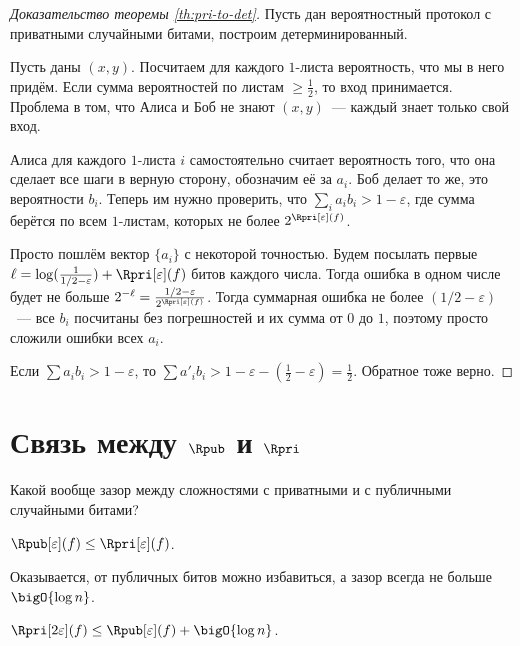 \begin{proof}[Доказательство теоремы \ref{th:pri-to-det}]
    Пусть дан вероятностный протокол с приватными случайными битами, построим детерминированный.

    Пусть даны $(x, y)$. Посчитаем для каждого $1$-листа вероятность, что мы в него придём. Если сумма
    вероятностей по листам $\ge \frac{1}{2}$, то вход принимается. Проблема в том, что Алиса и Боб не
    знают $(x, y)$~--- каждый знает только свой вход.

    Алиса для каждого $1$-листа $i$ самостоятельно считает вероятность того, что она сделает все шаги в
    верную сторону, обозначим её за $a_i$. Боб делает то же, это вероятности $b_i$. Теперь им нужно
    проверить, что $\sum\limits_i a_ib_i > 1 - \varepsilon$, где сумма берётся по всем $1$-листам,
    которых не более $2^{\Rpri[\varepsilon](f)}$.

    Просто пошлём вектор $\{a_i\}$ с некоторой точностью. Будем посылать первые $\ell = \log(\frac{1}{1/2
        - \varepsilon}) + \Rpri[\varepsilon](f)$ битов каждого числа. Тогда ошибка в одном числе будет не
    больше $2^{-\ell} = \frac{1/2 - \varepsilon}{2^{\Rpri[\varepsilon](f)}}$. Тогда суммарная ошибка не
    более $(1 / 2 - \varepsilon)$~--- все $b_i$ посчитаны без погрешностей и их сумма от $0$ до $1$,
    поэтому просто сложили ошибки всех $a_i$.

    Если $\sum a_ib_i >  1 - \varepsilon$, то $\sum a'_ib_i >  1 - \varepsilon - (\frac{1}{2} -
    \varepsilon) = \frac{1}{2}$. Обратное тоже верно.
\end{proof}

\section{Связь между \texorpdfstring{$\Rpub$}{R[pub]} и \texorpdfstring{$\Rpri$}{R[pr]}}
Какой вообще зазор между сложностями с приватными и с публичными случайными битами?
\begin{proposition}
    $\Rpub[\varepsilon](f) \le \Rpri[\varepsilon](f)$.
\end{proposition}

Оказывается, от публичных битов можно избавиться, а зазор всегда не больше $\bigO{\log n}$.
\begin{theorem}
    $\Rpri[2 \varepsilon](f) \le \Rpub[\varepsilon](f) + \bigO{\log n}$.
\end{theorem}

